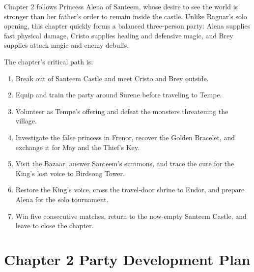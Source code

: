 \documentclass[
  american,
  10pt,
  letterpaper,
  oneside,
  open=any]{scrreprt}
\providecommand{\tightlist}{%
  \setlength{\itemsep}{0pt}\setlength{\parskip}{0pt}}
\begin{document}
Chapter 2 follows Princess Alena of Santeem, whose desire to see the
world is stronger than her father's order to remain inside the castle.
Unlike Ragnar's solo opening, this chapter quickly forms a balanced
three-person party: Alena supplies fast physical damage, Cristo supplies
healing and defensive magic, and Brey supplies attack magic and enemy
debuffs.

The chapter's critical path is:

\begin{enumerate}
\def\labelenumi{\arabic{enumi}.}
\tightlist
\item
  Break out of Santeem Castle and meet Cristo and Brey outside.
\item
  Equip and train the party around Surene before traveling to Tempe.
\item
  Volunteer as Tempe's offering and defeat the monsters threatening the
  village.
\item
  Investigate the false princess in Frenor, recover the Golden Bracelet,
  and exchange it for May and the Thief's Key.
\item
  Visit the Bazaar, answer Santeem's summons, and trace the cure for the
  King's lost voice to Birdsong Tower.
\item
  Restore the King's voice, cross the travel-door shrine to Endor, and
  prepare Alena for the solo tournament.
\item
  Win five consecutive matches, return to the now-empty Santeem Castle,
  and leave to close the chapter.
\end{enumerate}

\section{Chapter 2 Party Development
Plan}\label{chapter-2-party-development-plan}
\end{document}
